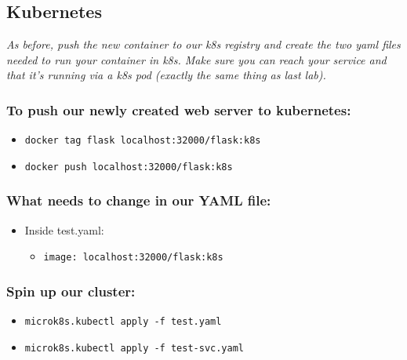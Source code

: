 \documentclass[
]{article}
\providecommand{\tightlist}{%
  \setlength{\itemsep}{0pt}\setlength{\parskip}{0pt}}
\begin{document}
\subsection{Kubernetes}\label{kubernetes}

\emph{As before, push the new container to our k8s registry and create
the two yaml files needed to run your container in k8s. Make sure you
can reach your service and that it's running via a k8s pod (exactly the
same thing as last lab).}

\subsubsection{To push our newly created web server to
kubernetes:}\label{to-push-our-newly-created-web-server-to-kubernetes}

\begin{itemize}
\tightlist
\item
  \texttt{docker\ tag\ flask\ localhost:32000/flask:k8s}
\item
  \texttt{docker\ push\ localhost:32000/flask:k8s}
\end{itemize}

\subsubsection{What needs to change in our YAML
file:}\label{what-needs-to-change-in-our-yaml-file}

\begin{itemize}
\tightlist
\item
  Inside test.yaml:

  \begin{itemize}
  \tightlist
  \item
    \texttt{image:\ localhost:32000/flask:k8s}
  \end{itemize}
\end{itemize}

\subsubsection{Spin up our cluster:}\label{spin-up-our-cluster}

\begin{itemize}
\tightlist
\item
  \texttt{microk8s.kubectl\ apply\ -f\ test.yaml}
\item
  \texttt{microk8s.kubectl\ apply\ -f\ test-svc.yaml}
\end{itemize}
\end{document}
